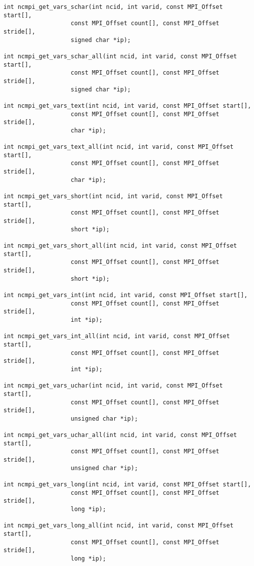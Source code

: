 \begin{verbatim}
int ncmpi_get_vars_schar(int ncid, int varid, const MPI_Offset start[],
                   const MPI_Offset count[], const MPI_Offset stride[],
                   signed char *ip);

int ncmpi_get_vars_schar_all(int ncid, int varid, const MPI_Offset start[],
                   const MPI_Offset count[], const MPI_Offset stride[],
                   signed char *ip);

int ncmpi_get_vars_text(int ncid, int varid, const MPI_Offset start[],
                   const MPI_Offset count[], const MPI_Offset stride[],
                   char *ip);

int ncmpi_get_vars_text_all(int ncid, int varid, const MPI_Offset start[],
                   const MPI_Offset count[], const MPI_Offset stride[],
                   char *ip);

int ncmpi_get_vars_short(int ncid, int varid, const MPI_Offset start[],
                   const MPI_Offset count[], const MPI_Offset stride[],
                   short *ip);

int ncmpi_get_vars_short_all(int ncid, int varid, const MPI_Offset start[],
                   const MPI_Offset count[], const MPI_Offset stride[],
                   short *ip);

int ncmpi_get_vars_int(int ncid, int varid, const MPI_Offset start[],
                   const MPI_Offset count[], const MPI_Offset stride[],
                   int *ip);

int ncmpi_get_vars_int_all(int ncid, int varid, const MPI_Offset start[],
                   const MPI_Offset count[], const MPI_Offset stride[],
                   int *ip);

int ncmpi_get_vars_uchar(int ncid, int varid, const MPI_Offset start[],
                   const MPI_Offset count[], const MPI_Offset stride[],
                   unsigned char *ip);

int ncmpi_get_vars_uchar_all(int ncid, int varid, const MPI_Offset start[],
                   const MPI_Offset count[], const MPI_Offset stride[],
                   unsigned char *ip);

int ncmpi_get_vars_long(int ncid, int varid, const MPI_Offset start[],
                   const MPI_Offset count[], const MPI_Offset stride[],
                   long *ip);

int ncmpi_get_vars_long_all(int ncid, int varid, const MPI_Offset start[],
                   const MPI_Offset count[], const MPI_Offset stride[],
                   long *ip);


\end{verbatim}

